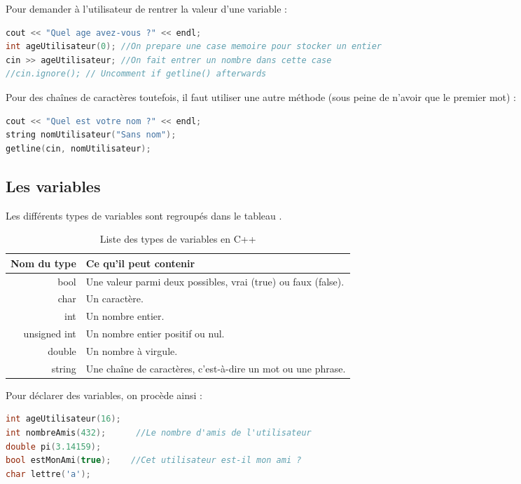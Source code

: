 \documentclass[a4paper,twoside]{article}
\begin{document}
Pour demander à l'utilisateur de rentrer la valeur d'une variable :
\begin{lstlisting}[language=C++]
cout << "Quel age avez-vous ?" << endl;
int ageUtilisateur(0); //On prepare une case memoire pour stocker un entier
cin >> ageUtilisateur; //On fait entrer un nombre dans cette case
//cin.ignore(); // Uncomment if getline() afterwards
\end{lstlisting}

Pour des chaînes de caractères toutefois, il faut utiliser une autre méthode (sous peine de n'avoir que le premier mot) : 
\begin{lstlisting}[language=C++]
cout << "Quel est votre nom ?" << endl;
string nomUtilisateur("Sans nom");
getline(cin, nomUtilisateur);
\end{lstlisting}


\subsection{Les variables}

Les différents types de variables sont regroupés dans le tableau .

\begin{table}[htb]
\centering
\begin{tabular}{|r|l|}
\hline
Nom du type & Ce qu'il peut contenir\\\hline
bool & Une valeur parmi deux possibles, vrai (true) ou faux (false).\\\hline
char & Un caractère.\\\hline
int & Un nombre entier.\\\hline
unsigned int & Un nombre entier positif ou nul.\\\hline
double & Un nombre à virgule.\\\hline
string & Une chaîne de caractères, c'est-à-dire un mot ou une phrase.\\\hline
\end{tabular}
\caption{Liste des types de variables en C++}\label{tab:type_variables}
\end{table}

Pour déclarer des variables, on procède ainsi :
\begin{lstlisting}[language=C++]
int ageUtilisateur(16);
int nombreAmis(432);      //Le nombre d'amis de l'utilisateur
double pi(3.14159);
bool estMonAmi(true);    //Cet utilisateur est-il mon ami ?
char lettre('a');
\end{lstlisting}
\end{document}
